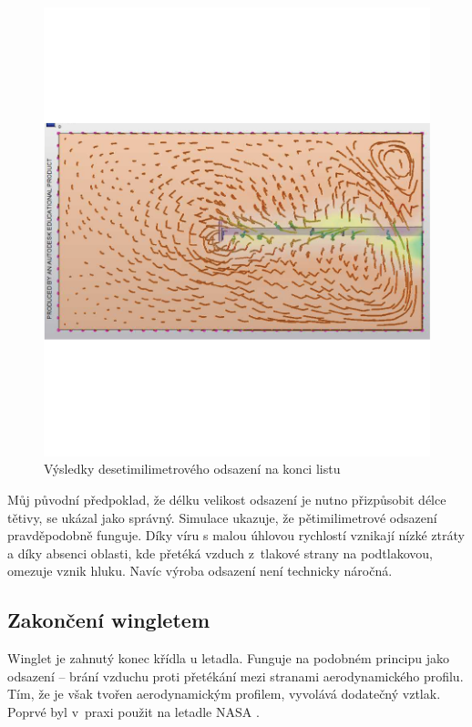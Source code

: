 \begin{figure}[H]
	\centering
	\includegraphics[]{obrazky/simulace/simulace6p}
	\caption{Výsledky desetimilimetrového odsazení na konci listu}
	\label{sim:6}
\end{figure}

Můj původní předpoklad, že délku velikost odsazení je nutno přizpůsobit délce tětivy, se ukázal jako správný. Simulace ukazuje, že pětimilimetrové odsazení pravděpodobně funguje. Díky víru s malou úhlovou rychlostí vznikají nízké ztráty a díky absenci oblasti, kde přetéká vzduch z~tlakové strany na podtlakovou, omezuje vznik hluku. Navíc výroba odsazení není technicky náročná.

\subsection{Zakončení wingletem}
Winglet je zahnutý konec křídla u letadla. Funguje na podobném principu jako odsazení – brání vzduchu proti přetékání mezi stranami aerodynamického profilu. Tím, že je však tvořen aerodynamickým profilem, vyvolává dodatečný vztlak. Poprvé byl v~praxi použit na letadle NASA \cite{winglet}.


